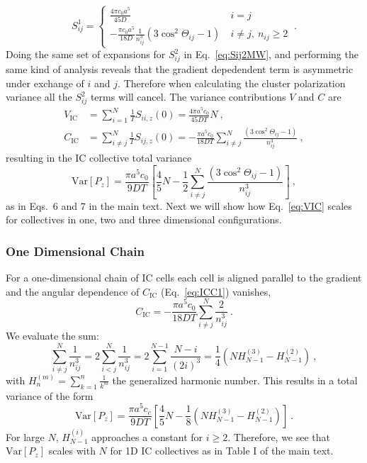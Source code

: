 \begin{equation}
    S_{ij}^1 =
    \begin{cases}
        \frac{4\pi c_0a^5}{45D} &\ i=j \\
        -\frac{\pi c_0a^5}{18D} \frac{1}{n_{ij}^3}(3\cos^2\Theta_{ij}-1) &\ i \neq j, \ n_{ij} \geq 2
    \end{cases} \ .
\end{equation}
Doing the same set of expansions for $S_{ij}^2$ in Eq.\ \ref{eq:Sij2MW}, and performing the same kind of analysis reveals that the gradient depedendent term is asymmetric under exchange of $i$ and $j$. Therefore when calculating the cluster polarization variance all the $S_{ij}^2$ terms will cancel. The variance contributions $V$ and $C$ are
\begin{align}
    V_\text{IC} &= \sum_{i=1}^N \frac{1}{T} S_{ii,z}(0) = \frac{4\pi a^5c_0}{45DT} N \ , \label{eq:ICV1} \\
    C_\text{IC} &= \sum_{i\neq j}^N \frac{1}{T} S_{ij,z}(0) = -\frac{\pi a^5c_0}{18DT} \sum_{i\neq j}^N \frac{(3\cos^2\Theta_{ij}-1)}{n_{ij}^3} \ \label{eq:ICC1},
\end{align}
resulting in the IC collective total variance
\begin{equation} \label{eq:VIC}
    \text{Var}[P_z] = \frac{\pi a^5c_0}{9DT} \left[ \frac{4}{5}N - \frac{1}{2}\sum_{i\neq j}^N \frac{(3\cos^2\Theta_{ij}-1)}{n_{ij}^3} \right] \ ,
\end{equation}
as in Eqs.\ 6 and 7 in the main text.
Next we will show how Eq.\ \ref{eq:VIC} scales for collectives in one, two and three dimensional configurations.


\subsubsection{One Dimensional Chain}

For a one-dimensional chain of IC cells each cell is aligned parallel to the gradient and the angular dependence of $C_\text{IC}$ (Eq.\ \ref{eq:ICC1}) vanishes,
\begin{equation}
    C_\text{IC} = -\frac{\pi a^5c_0}{18DT} \sum_{i\neq j}^N \frac{2}{n_{ij}^3} \ .
\end{equation}
We evaluate the sum:
\begin{equation*}
    \sum_{i\neq j}^N \frac{1}{n_{ij}^3} = 2 \sum_{i<j}^N \frac{1}{n_{ij}^3} = 2 \sum_{i=1}^{N-1} \frac{N-i}{(2i)^3} = \frac{1}{4}(N H_{N-1}^{(3)} - H_{N-1}^{(2)}) \ ,
\end{equation*}
with $H_n^{(m)} = \sum_{k=1}^n \frac{1}{k^m}$ the generalized harmonic number. This results in a total variance of the form
\begin{equation}
    \text{Var}[P_z] = \frac{\pi a^5c_c}{9DT} \left[ \frac{4}{5}N - \frac{1}{8} \left( N H_{N-1}^{(3)} - H_{N-1}^{(2)} \right) \right] \ .
\end{equation}
For large $N$, $H_{N-1}^{(i)}$ approaches a constant for $i \geq 2$. Therefore, we see that $\text{Var}[P_z]$ scales with $N$ for 1D IC collectives as in Table I of the main text.


